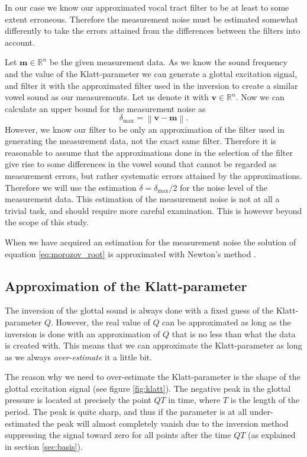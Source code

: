 \documentclass[12pt,a4]{article}
\newcommand{\R}{{\mathbb R}}
\newcommand{\lnorm}{\left\|}
\newcommand{\rnorm}{\right\|}
\newcommand{\vc}[1]{\ensuremath{\bm{#1}}}
\begin{document}
In our case we know our approximated vocal tract filter to be at least to some extent erroneous. Therefore the measurement noise must be estimated somewhat differently to take the errors attained from the differences between the filters into account.

Let $\vc{m} \in \R^n$ be the given measurement data. As we know the sound frequency and the value of the Klatt-parameter we can generate a glottal excitation signal, and filter it with the approximated filter used in the inversion to create a similar vowel sound as our measurements. Let us denote it with $\vc{v} \in \R^n$. Now we can calculate an upper bound for the measurement noise as
\begin{equation}
\delta_{\text{max}} = \lnorm \vc{v} - \vc{m} \rnorm .
\end{equation}
However, we know our filter to be only an approximation of the filter used in generating the measurement data, not the exact same filter. Therefore it is reasonable to assume that the approximations done in the selection of the filter give rise to some differences in the vowel sound that cannot be regarded as measurement errors, but rather systematic errors attained by the approximations. Therefore we will use the estimation $\delta = \delta_{\text{max}} / 2$ for the noise level of the measurement data. This estimation of the measurement noise is not at all a trivial task, and should require more careful examination. This is however beyond the scope of this study.
 
When we have acquired an estimation for the measurement noise the solution of equation \eqref{eq:morozov_root} is approximated with Newton's method \cite{NR}.


\subsection{Approximation of the Klatt-parameter}
\label{sec:approxKlatt}

The inversion of the glottal sound is always done with a fixed guess of the Klatt-parameter $Q$. However, the real value of $Q$ can be approximated as long as the inversion is done with an approximation of $Q$ that is no less than what the data is created with. This means that we can approximate the Klatt-parameter as long as we always \emph{over-estimate} it a little bit.

The reason why we need to over-estimate the Klatt-parameter is the shape of the glottal excitation signal (see figure \ref{fig:klatt}). The negative peak in the glottal pressure is located at precisely the point $QT$ in time, where $T$ is the length of the period. The peak is quite sharp, and thus if the parameter is at all under-estimated the peak will almost completely vanish due to the inversion method suppressing the signal toward zero for all points after the time $QT$ (as explained in section \ref{sec:basis}).
\end{document}

